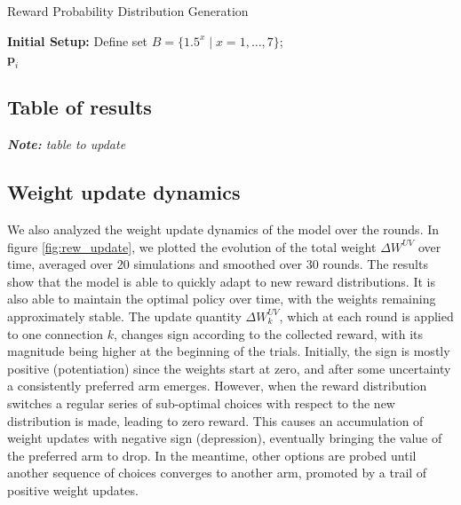 \begin{algorithm}[ht]
\caption{Reward Probability Distribution Generation}
\label{alg:reward_distribution}
\SetAlgoLined
{}
\textbf{Initial Setup:}
Define set $B = \{1.5^x \mid x = 1, \ldots, 7\}$; \\
\Return ${\mathbf{p}_i}$
\end{algorithm}


\subsection{Table of results}

\textit{\textbf{Note:} table to update}


\subsection{Weight update dynamics}
\noindent We also analyzed the weight update dynamics of the model over the rounds.
In figure \ref{fig:rew_update}, we plotted the evolution of the total weight $\Delta W^{UV}$ over time, averaged over 20 simulations and smoothed over 30 rounds.
The results show that the model is able to quickly adapt to new reward distributions. It is also able to maintain the optimal policy over time, with the weights remaining approximately stable.
The update quantity $\Delta W_{k}^{UV}$, which at each round is applied to one connection $k$, changes sign according to the collected reward, with its magnitude being higher at the beginning of the trials.
Initially, the sign is mostly positive (potentiation) since the weights start at zero, and after some uncertainty a consistently preferred arm emerges.
However, when the reward distribution switches a regular series of sub-optimal choices with respect to the new distribution is made, leading to zero reward.
This causes an accumulation of weight updates with negative sign (depression), eventually bringing the value of the preferred arm to drop. In the meantime, other options are probed until another sequence of choices converges to another arm, promoted by a trail of positive weight updates.

